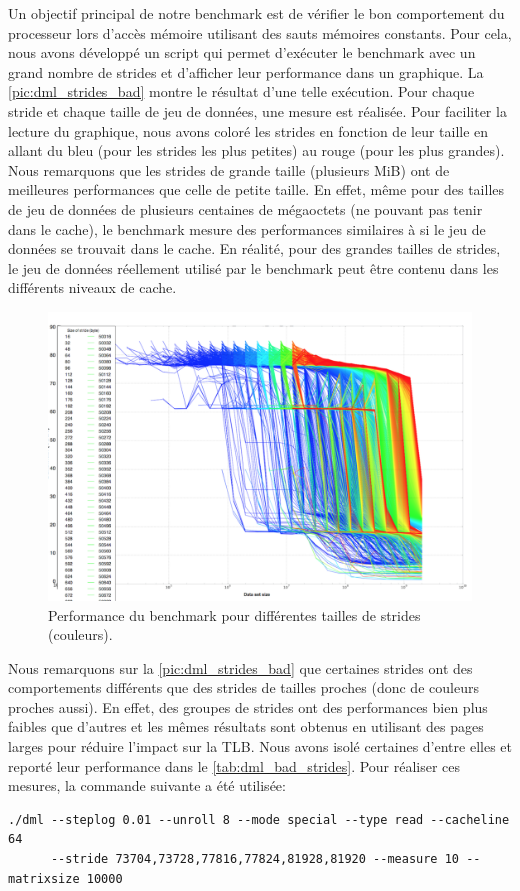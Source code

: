         Un objectif principal de notre benchmark est de vérifier le bon comportement du processeur lors d'accès mémoire utilisant des sauts mémoires constants. Pour cela, nous avons développé un script qui permet d'exécuter le benchmark avec un grand nombre de strides et d'afficher leur performance dans un graphique. La \autoref{pic:dml_strides_bad} montre le résultat d'une telle exécution. Pour chaque stride et chaque taille de jeu de données, une mesure est réalisée. Pour faciliter la lecture du graphique, nous avons coloré les strides en fonction de leur taille en allant du bleu (pour les strides les plus petites) au rouge (pour les plus grandes). Nous remarquons que les strides de grande taille (plusieurs MiB) ont de meilleures performances que celle de petite taille. En effet, même pour des tailles de jeu de données de plusieurs centaines de mégaoctets (ne pouvant pas tenir dans le cache), le benchmark mesure des performances similaires à si le jeu de données se trouvait dans le cache. En réalité, pour des grandes tailles de strides, le jeu de données réellement utilisé par le benchmark peut être contenu dans les différents niveaux de cache. 
      
        \begin{figure}
        \center
        \includegraphics[width=12cm]{images/dml_strides_bad.png}
        \caption{\label{pic:dml_strides_bad} Performance du benchmark pour différentes tailles de strides (couleurs).  }
        \end{figure}
        
        Nous remarquons sur la \autoref{pic:dml_strides_bad} que certaines strides ont des comportements différents que des strides de tailles proches (donc de couleurs proches aussi). En effet, des groupes de strides ont des performances bien plus faibles que d'autres et les mêmes résultats sont obtenus en utilisant des pages larges pour réduire l'impact sur la TLB. Nous avons isolé certaines d'entre elles et reporté leur performance dans le  \autoref{tab:dml_bad_strides}. Pour réaliser ces mesures, la commande suivante a été utilisée: 
        \begin{verbatim}
./dml --steplog 0.01 --unroll 8 --mode special --type read --cacheline 64 
      --stride 73704,73728,77816,77824,81928,81920 --measure 10 --matrixsize 10000
        \end{verbatim}
        
